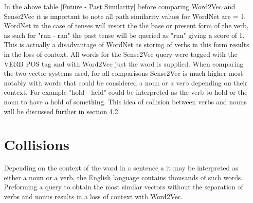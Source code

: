 \noindent
In the above table \ref{Future - Past Similarity} before comparing Word2Vec and Sense2Vec it is important to note all path similarity values for WordNet are = 1. WordNet in the case of tenses will resort the the base or present form of the verb, as such for "run - ran" the past tense will be queried as "run" giving a score of 1. This is actually a disadvantage of WordNet as storing of verbs in this form results in the loss of context. All words for the Sense2Vec query were tagged with the VERB POS tag and with Word2Vec just the word is supplied. When comparing the two vector systems used, for all comparisons Sense2Vec is much higher most notably with words that could be considered a noun or a verb depending on their context. For example "hold - held" could be interpreted as the verb to hold or the noun to have a hold of something. This idea of collision between verbs and nouns will be discussed further in section 4.2.

\section{Collisions}
Depending on the context of the word in a sentence a it may be interpreted as either a noun or a verb, the English language contains thousands of such words. Preforming a query to obtain the most similar vectors without the separation of verbs and nouns results in a loss of context with Word2Vec.

